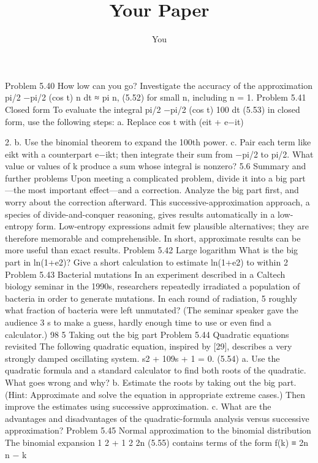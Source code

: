 \documentclass[a4paper]{article}
\title{Your Paper}
\author{You}
\begin{document}
 
Problem 5.40 How low can you go?
Investigate the accuracy of the approximation
pi/2
−pi/2
(cos t)
n dt ≈
	pi
n, (5.52)
for small n, including n = 1.
Problem 5.41 Closed form
To evaluate the integral
pi/2
−pi/2
(cos t)
100 dt (5.53)
in closed form, use the following steps:
a. Replace cos t with (eit + e−it)

2.
b. Use the binomial theorem to expand the 100th power.
c. Pair each term like eikt with a counterpart e−ikt; then integrate their sum
from −pi/2 to pi/2. What value or values of k produce a sum whose integral
is nonzero?
5.6 Summary and further problems
Upon meeting a complicated problem, divide it into a big part—the most
important effect—and a correction. Analyze the big part first, and worry
about the correction afterward. This successive-approximation approach,
a species of divide-and-conquer reasoning, gives results automatically
in a low-entropy form. Low-entropy expressions admit few plausible
alternatives; they are therefore memorable and comprehensible. In short,
approximate results can be more useful than exact results.
Problem 5.42 Large logarithm
What is the big part in ln(1+e2)? Give a short calculation to estimate ln(1+e2)
to within 2%
Problem 5.43 Bacterial mutations
In an experiment described in a Caltech biology seminar in the 1990s, researchers
repeatedly irradiated a population of bacteria in order to generate mutations. In
each round of radiation, 5%
roughly what fraction of bacteria were left unmutated? (The seminar speaker
gave the audience 3 s to make a guess, hardly enough time to use or even find
a calculator.)
98 5 Taking out the big part
Problem 5.44 Quadratic equations revisited
The following quadratic equation, inspired by [29], describes a very strongly
damped oscillating system.
s2 + 109s + 1 = 0. (5.54)
a. Use the quadratic formula and a standard calculator to find both roots of the
quadratic. What goes wrong and why?
b. Estimate the roots by taking out the big part. (Hint: Approximate and solve
the equation in appropriate extreme cases.) Then improve the estimates using
successive approximation.
c. What are the advantages and disadvantages of the quadratic-formula analysis
versus successive approximation?
Problem 5.45 Normal approximation to the binomial distribution
The binomial expansion
1
2 +
1
2
2n
(5.55)
contains terms of the form
f(k) ≡
 2n
n − k
\end{document}
